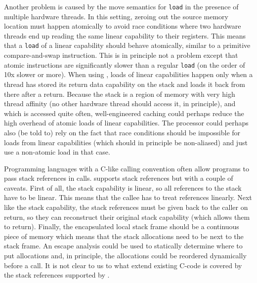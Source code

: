 Another problem is caused by the move semantics for \texttt{load} in the presence of multiple hardware threads.
In this setting, zeroing out the source memory location must happen atomically to avoid race conditions where two hardware threads end up reading the same linear capability to their registers.
This means that a \texttt{load} of a linear capability should behave atomically, similar to a primitive compare-and-swap instruction.
This is in principle not a problem except that atomic instructions are significantly slower than a regular \texttt{load} (on the order of 10x slower or more).
When using \stktokens{}, loads of linear capabilities happen only when a thread has stored its return data capability on the stack and loads it back from there after a return.
Because the stack is a region of memory with very high thread affinity (no other hardware thread should access it, in principle), and which is accessed quite often, well-engineered caching could perhaps reduce the high overhead of atomic loads of linear capabilities.
The processor could perhaps also (be told to) rely on the fact that race conditions should be impossible for loads from linear capabilities (which should in principle be non-aliased) and just use a non-atomic load in that case.

\begin{jversion}
  Programming languages with a C-like calling convention often allow programs to pass stack references in calls.
  \stktokens{} supports stack references but with a couple of caveats.
  First of all, the stack capability is linear, so all references to the stack have to be linear.
  This means that the callee has to treat references linearly.
  Next like the stack capability, the stack references must be given back to the caller on return, so they can reconstruct their original stack capability (which allows them to return). 
  Finally, the encapsulated local stack frame should be a continuous piece of memory which means that the stack allocations need to be next to the stack frame.
  An escape analysis could be used to statically determine where to put allocations and, in principle, the allocations could be reordered dynamically before a call.
  It is not clear to us to what extend existing C-code is covered by the stack references supported by \stktokens{}.
\end{jversion}


